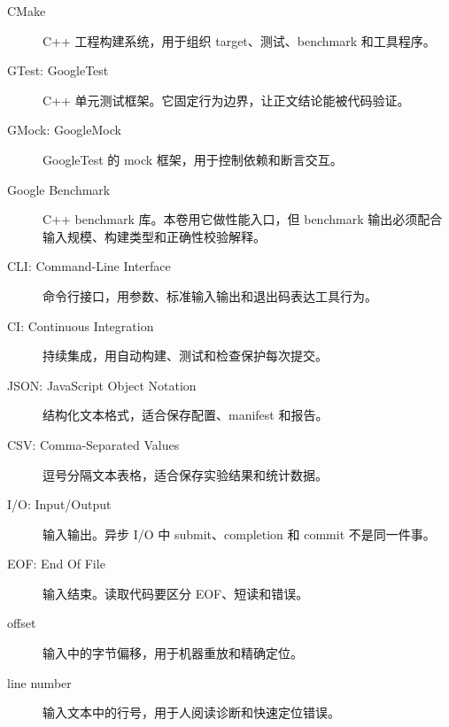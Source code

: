 \begin{description}
  \item[CMake] C++ 工程构建系统，用于组织 target、测试、benchmark 和工具程序。
  \item[GTest: GoogleTest] C++ 单元测试框架。它固定行为边界，让正文结论能被代码验证。
  \item[GMock: GoogleMock] GoogleTest 的 mock 框架，用于控制依赖和断言交互。
  \item[Google Benchmark] C++ benchmark 库。本卷用它做性能入口，但 benchmark 输出必须配合输入规模、构建类型和正确性校验解释。
  \item[CLI: Command-Line Interface] 命令行接口，用参数、标准输入输出和退出码表达工具行为。
  \item[CI: Continuous Integration] 持续集成，用自动构建、测试和检查保护每次提交。
  \item[JSON: JavaScript Object Notation] 结构化文本格式，适合保存配置、manifest 和报告。
  \item[CSV: Comma-Separated Values] 逗号分隔文本表格，适合保存实验结果和统计数据。
  \item[I/O: Input/Output] 输入输出。异步 I/O 中 submit、completion 和 commit 不是同一件事。
  \item[EOF: End Of File] 输入结束。读取代码要区分 EOF、短读和错误。
  \item[offset] 输入中的字节偏移，用于机器重放和精确定位。
  \item[line number] 输入文本中的行号，用于人阅读诊断和快速定位错误。
\end{description}
